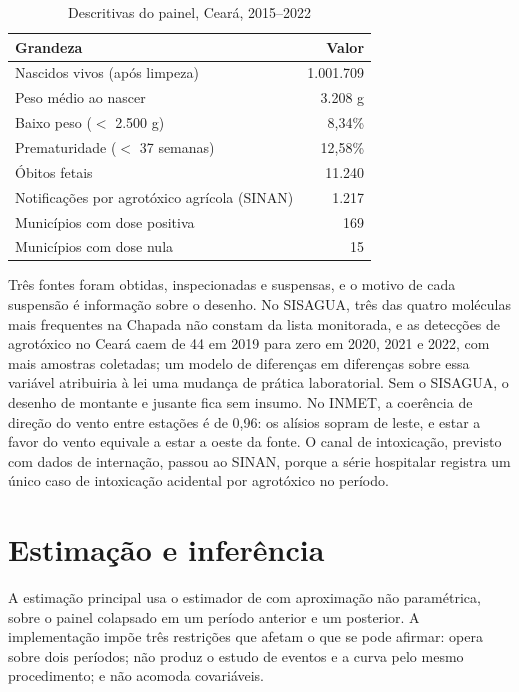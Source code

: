 \begin{table}[htb]
\centering
\caption{Descritivas do painel, Ceará, 2015--2022}
\label{tab:descritivas}
\small
\begin{tabular}{lr}
\toprule
Grandeza & Valor \\
\midrule
Nascidos vivos (após limpeza)                 & 1.001.709 \\
Peso médio ao nascer                          & 3.208 g \\
Baixo peso ($<$ 2.500 g)                      & 8,34\% \\
Prematuridade ($<$ 37 semanas)                & 12,58\% \\
Óbitos fetais                                 & 11.240 \\
Notificações por agrotóxico agrícola (SINAN)  & 1.217 \\
Municípios com dose positiva                  & 169 \\
Municípios com dose nula                      & 15 \\
\bottomrule
\end{tabular}
\end{table}

Três fontes foram obtidas, inspecionadas e suspensas, e o motivo de cada
suspensão é informação sobre o desenho. No SISAGUA, três das quatro moléculas
mais frequentes na Chapada não constam da lista monitorada, e as detecções de
agrotóxico no Ceará caem de 44 em 2019 para zero em 2020, 2021 e 2022, com mais
amostras coletadas; um modelo de diferenças em diferenças sobre essa variável
atribuiria à lei uma mudança de prática laboratorial. Sem o SISAGUA, o desenho
de montante e jusante fica sem insumo. No INMET, a coerência de direção do
vento entre estações é de 0,96: os alísios sopram de leste, e estar a favor do
vento equivale a estar a oeste da fonte. O canal de intoxicação, previsto com
dados de internação, passou ao SINAN, porque a série hospitalar registra um
único caso de intoxicação acidental por agrotóxico no período.

\section{Estimação e inferência}
\label{sec:estimacao}

A estimação principal usa o estimador de \citet{callaway2024continuous} com
aproximação não paramétrica, sobre o painel colapsado em um período anterior e
um posterior. A implementação impõe três restrições que afetam o que se pode
afirmar: opera sobre dois períodos; não produz o estudo de eventos e a curva
pelo mesmo procedimento; e não acomoda covariáveis.


